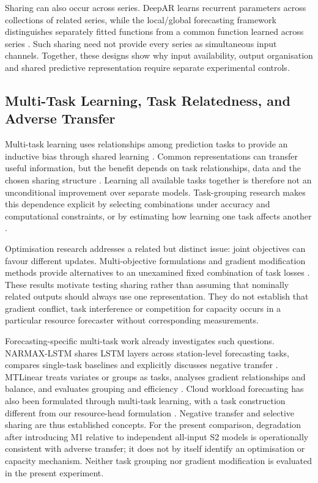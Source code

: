 \documentclass[a4paper,fleqn]{cas-dc}
\begin{document}
Sharing can also occur across series. DeepAR learns recurrent parameters
across collections of related series, while the local/global
forecasting framework distinguishes separately fitted functions from a common
function learned across series
\citep{Salinas2020DeepAR,MonteroManso2021GlobalForecasting}. Such sharing need
not provide every series as simultaneous input channels. Together, these
designs show why input availability, output organisation and shared predictive
representation require separate experimental controls.

\subsection{Multi-Task Learning, Task Relatedness, and Adverse Transfer}
\label{sec:rw-multitask}

Multi-task learning uses relationships among prediction tasks to provide an
inductive bias through shared learning \citep{Caruana1997Multitask}.
Common representations can transfer useful information, but the benefit
depends on task relationships, data and the chosen sharing structure
\citep{Yu2025MultitaskFundamentals}. Learning all available tasks together is
therefore not an unconditional improvement over separate models. Task-grouping
research makes this dependence explicit by selecting combinations under
accuracy and computational constraints, or by estimating how learning one task
affects another \citep{Standley2020TaskGrouping,Fifty2021TaskGroupings}.

Optimisation research addresses a related but distinct issue: joint objectives
can favour different updates. Multi-objective formulations and gradient
modification methods provide alternatives to an unexamined fixed combination
of task losses \citep{Sener2018MultiObjective,Yu2020GradientSurgery}. These
results motivate testing sharing rather than assuming that nominally related
outputs should always use one representation. They do not establish that
gradient conflict, task interference or competition for capacity occurs in a
particular resource forecaster without corresponding measurements.

Forecasting-specific multi-task work already investigates such questions.
NARMAX-LSTM shares LSTM layers across station-level forecasting tasks,
compares single-task baselines and explicitly discusses negative transfer
\citep{Nikentari2022NARMAXLSTM}. MTLinear treats variates or groups as tasks,
analyses gradient relationships and balance, and evaluates grouping and
efficiency \citep{Nochumsohn2025MTLinear}. Cloud workload forecasting has
also been formulated through multi-task learning, with a task construction
different from our resource-head formulation \citep{Bi2019CloudMultitask}.
Negative transfer and selective sharing are thus established concepts. For the
present comparison, degradation after introducing M1 relative to independent
all-input S2 models is operationally consistent with adverse transfer; it does
not by itself identify an optimisation or capacity mechanism.
Neither task grouping nor gradient modification is evaluated in the present
experiment.
\end{document}
